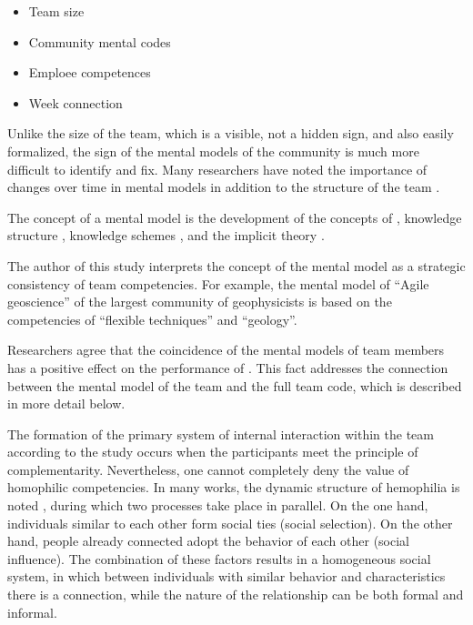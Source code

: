 \documentclass[12pt]{report}
\theoremstyle{definition}
\providecommand{\tightlist}{%
	\setlength{\itemsep}{0pt}\setlength{\parskip}{0pt}}
\begin{document}
\begin{itemize}
	\tightlist
	\item Team size         
	\item Community mental codes
	\item Emploee competences
	\item Week connection
\end{itemize}

Unlike the size of the team, which is a visible, not a hidden sign, and also easily formalized, the sign of the mental models of the community is much more difficult to identify and fix.
Many researchers have noted the importance of changes over time in mental models in addition to the structure of the team \cite{klimoski1994team, morgeson1999structure}.

The concept of a mental model is the development of the concepts of \cite{walsh1995managerial}, knowledge structure \cite{fiske2013social}, knowledge schemes \cite{sims1986thinking}, and the implicit theory \cite{brief1983cognitive}.

The author of this study interprets the concept of the mental model as a strategic consistency of team competencies.
For example, the mental model of ``Agile geoscience'' \cite{hall2011shale} of the largest community of geophysicists is based on the competencies of ``flexible techniques'' and ``geology''.

Researchers agree that the coincidence of the mental models of team members has a positive effect on the performance of \cite{lim2006team, mathieu2000influence}.
This fact addresses the connection between the mental model of the team and the full team code, which is described in more detail below.

The formation of the primary system of internal interaction within the team according to the study \cite{harper1985power} occurs when the participants meet the principle of complementarity.
Nevertheless, one cannot completely deny the value of homophilic competencies.
In many works, the dynamic structure of hemophilia is noted \cite{mcpherson2001birds, snijders2010introduction, steglich20108}, during which two processes take place in parallel.
On the one hand, individuals similar to each other form social ties (social selection).
On the other hand, people already connected adopt the behavior of each other (social influence).
The combination of these factors results in a homogeneous social system, in which between individuals with similar behavior and characteristics there is a connection, while the nature of the relationship can be both formal and informal.
\end{document}

